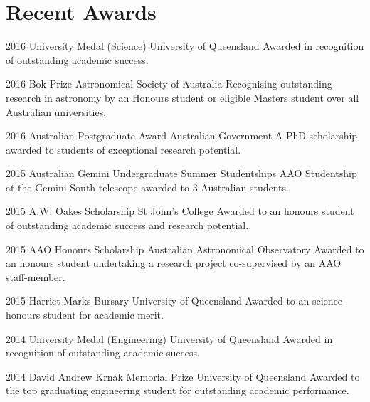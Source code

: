 \documentclass[]{friggeri-cv} %
\begin{document}
\section{Recent Awards}
\begin{entrylist}
\entry
{2016}
{University Medal (Science)}
{University of Queensland}
{Awarded in recognition of outstanding academic success.}
\end{entrylist}
\begin{entrylist}
	\entry
{2016}
{Bok Prize}
{Astronomical Society of Australia}
{Recognising outstanding research in astronomy by an Honours student or eligible Masters student over all Australian universities.}
\end{entrylist}
\begin{entrylist}
	\entry
{2016}
{Australian Postgraduate Award}
{Australian Government}
{A PhD scholarship awarded to students of exceptional research potential.}
\end{entrylist}
\begin{entrylist}
	\entry
{2015}
{Australian Gemini Undergraduate Summer Studentships}
{AAO}
{Studentship at the Gemini South telescope awarded to 3 Australian students.}
\end{entrylist}
\begin{entrylist}
\entry
{2015}
{A.W. Oakes Scholarship}
{St John's College}
{Awarded to an honours student of outstanding academic success and research potential.}
\end{entrylist}
\begin{entrylist}
\entry
{2015}
{AAO Honours Scholarship}
{Australian Astronomical Observatory}
{Awarded to an honours student undertaking a research project co-supervised by an AAO staff-member.}
\end{entrylist}
\begin{entrylist}
\entry
{2015}
{Harriet Marks Bursary}
{University of Queensland}
{Awarded to an science honours student for academic merit.}
\end{entrylist}
\begin{entrylist}
\entry
{2014}
{University Medal (Engineering)}
{University of Queensland}
{Awarded in recognition of outstanding academic success.}
\end{entrylist}
\begin{entrylist}
\entry
{2014}
{David Andrew Krnak Memorial Prize}
{University of Queensland}
{Awarded to the top graduating engineering student for outstanding academic performance.}
\end{entrylist}
\end{document}
